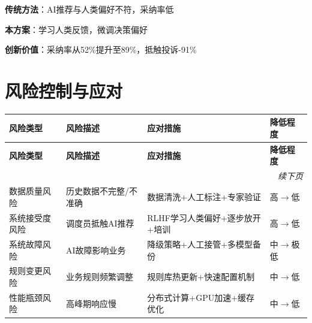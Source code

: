 \documentclass[12pt,a4paper]{article}
\begin{document}
\begin{tcolorbox}[colback=purple!5!white,colframe=purple!75!black,title=创新对比]
\textbf{传统方法}：AI推荐与人类偏好不符，采纳率低

\textbf{本方案}：学习人类反馈，微调决策偏好

\textbf{创新价值}：采纳率从52\%提升至89\%，抵触投诉-91\%
\end{tcolorbox}

\section{风险控制与应对}

\begin{longtable}{p{3cm}p{4cm}p{5cm}p{2cm}}
\toprule
\textbf{风险类型} & \textbf{风险描述} & \textbf{应对措施} & \textbf{降低程度} \\
\midrule
\endfirsthead
\toprule
\textbf{风险类型} & \textbf{风险描述} & \textbf{应对措施} & \textbf{降低程度} \\
\midrule
\endhead
\midrule
\multicolumn{4}{r}{\textit{续下页}} \\
\endfoot
\bottomrule
\endlastfoot

数据质量风险 & 历史数据不完整/不准确 & 数据清洗+人工标注+专家验证 & 高$\rightarrow$低 \\
\midrule
系统接受度风险 & 调度员抵触AI推荐 & RLHF学习人类偏好+逐步放开+培训 & 高$\rightarrow$低 \\
\midrule
系统故障风险 & AI故障影响业务 & 降级策略+人工接管+多模型备份 & 中$\rightarrow$极低 \\
\midrule
规则变更风险 & 业务规则频繁调整 & 规则库热更新+快速配置机制 & 中$\rightarrow$低 \\
\midrule
性能瓶颈风险 & 高峰期响应慢 & 分布式计算+GPU加速+缓存优化 & 中$\rightarrow$低 \\
\end{longtable}
\end{document}
